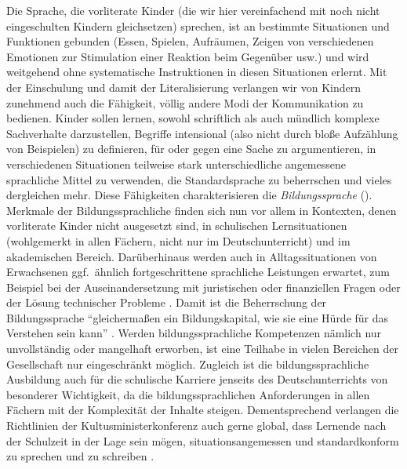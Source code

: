 Die Sprache, die vorliterate Kinder (die wir hier vereinfachend mit noch nicht eingeschulten Kindern gleichsetzen) sprechen, ist an bestimmte Situationen und Funktionen gebunden (Essen, Spielen, Aufräumen, Zeigen von verschiedenen Emotionen zur Stimulation einer Reaktion beim Gegenüber usw.) und wird weitgehend ohne systematische Instruktionen in diesen Situationen erlernt.
Mit der Einschulung und damit der Literalisierung verlangen wir von Kindern zunehmend auch die Fähigkeit, völlig andere Modi der Kommunikation zu bedienen.
Kinder sollen lernen, sowohl schriftlich als auch mündlich komplexe Sachverhalte darzustellen, Begriffe intensional (also nicht durch bloße Aufzählung von Beispielen) zu definieren, für oder gegen eine Sache zu argumentieren, in verschiedenen Situationen teilweise stark unterschiedliche angemessene sprachliche Mittel zu verwenden, die Standardsprache zu beherrschen und vieles dergleichen mehr.
Diese Fähigkeiten charakterisieren die \textit{Bildungssprache} (\zB \citealt{Feilke2012}).
Merkmale der Bildungssprachliche finden sich nun vor allem in Kontexten, denen vorliterate Kinder nicht ausgesetzt sind, \zB in schulischen Lernsituationen (wohlgemerkt in allen Fächern, nicht nur im Deutschunterricht) und im akademischen Bereich.
Darüberhinaus werden auch in Alltagssituationen von Erwachsenen ggf.\ ähnlich fortgeschrittene sprachliche Leistungen erwartet, zum Beispiel bei der Auseinandersetzung mit juristischen oder finanziellen Fragen oder der Lösung technischer Probleme \citep[5]{Feilke2012}.
Damit ist die Beherrschung der Bildungssprache "`gleichermaßen ein Bildungskapital, wie sie eine Hürde für das Verstehen sein kann"' \citep[11]{Feilke2012}.
Werden bildungssprachliche Kompetenzen nämlich nur unvollständig oder mangelhaft erworben, ist eine Teilhabe in vielen Bereichen der Gesellschaft nur eingeschränkt möglich.
Zugleich ist die bildungssprachliche Ausbildung auch für die schulische Karriere jenseits des Deutschunterrichts von besonderer Wichtigkeit, da die bildungssprachlichen Anforderungen in allen Fächern mit der Komplexität der Inhalte steigen.
Dementsprechend verlangen die Richtlinien der Kultusministerkonferenz auch gerne global, dass Lernende nach der Schulzeit in der Lage sein mögen, situationsangemessen und standardkonform zu sprechen und zu schreiben \citep[6]{Eisenberg2004}.

